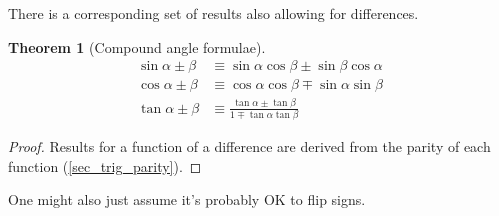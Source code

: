 \documentclass[fleqn,a4paper,11pt]{article}
\newtheorem{theorem}{Theorem}[section]
\begin{document}
    There is a corresponding set of results also allowing for differences.
    \begin{theorem}[Compound angle formulae] \label{thm_trig_compound}
    \begin{align*}
    \sin \alpha \pm \beta &\equiv
       \sin \alpha \cos \beta \pm \sin \beta \cos \alpha \\
    \cos \alpha \pm \beta &\equiv
       \cos \alpha \cos \beta \mp \sin \alpha \sin \beta \\
    \tan \alpha \pm \beta &\equiv
        \frac{\tan \alpha \pm \tan \beta}{1 \mp \tan \alpha \tan \beta}
    \end{align*}
    \end{theorem}
    \begin{proof}
    Results for a function of a difference are derived from the parity of
    each function (\ref{sec_trig_parity}).
    \end{proof}
    One might also just assume it's probably OK to flip signs.
\end{document}
